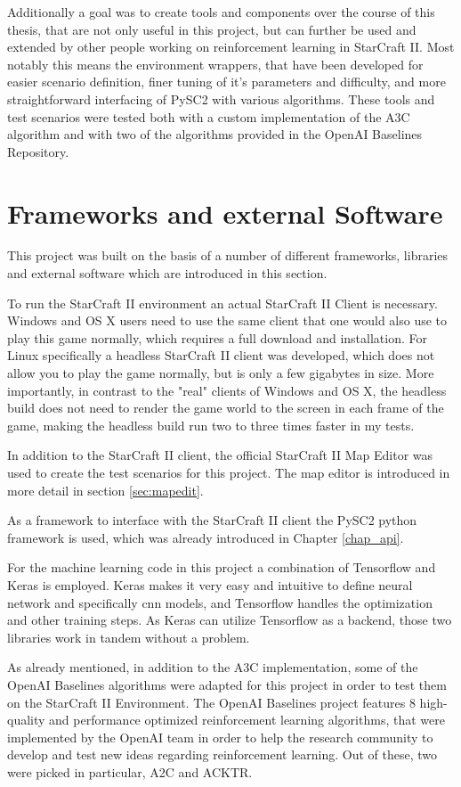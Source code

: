 Additionally a goal was to create tools and components over the course of this thesis, that are not only useful in this project, but can further be used and extended by other people working on reinforcement learning in StarCraft II. Most notably this means the environment wrappers, that have been developed for easier scenario definition, finer tuning of it's parameters and difficulty, and more straightforward interfacing of PySC2 with various algorithms. These tools and test scenarios were tested both with a custom implementation of the A3C algorithm and with two of the algorithms provided in the OpenAI Baselines Repository.

\section{Frameworks and external Software}
\label{sec:fworks}
This project was built on the basis of a number of different frameworks, libraries and external software which are introduced in this section.

To run the StarCraft II environment an actual StarCraft II Client is necessary. Windows and OS X users need to use the same client that one would also use to play this game normally, which requires a full download and installation. For Linux specifically a headless StarCraft II client was developed, which does not allow you to play the game normally, but is only a few gigabytes in size. More importantly, in contrast to the "real" clients of Windows and OS X, the headless build  does not need to render the game world to the screen in each frame of the game, making the headless build run two to three times faster in my tests.

In addition to the StarCraft II client, the official StarCraft II Map Editor was used to create the test scenarios for this project. The map editor is introduced in more detail in section \ref{sec:mapedit}.

As a framework to interface with the StarCraft II client the PySC2 python framework is used, which was already introduced in Chapter \ref{chap_api}.

For the machine learning code in this project a combination of Tensorflow and Keras is employed.
Keras makes it very easy and intuitive to define neural network and specifically cnn models, and Tensorflow handles the optimization and other training steps. As Keras can utilize Tensorflow as a backend, those two libraries work in tandem without a problem.

As already mentioned, in addition to the A3C implementation, some of the OpenAI Baselines algorithms were adapted for this project in order to test them on the StarCraft II Environment. The OpenAI Baselines project features 8 high-quality and performance optimized reinforcement learning algorithms, that were implemented by the OpenAI team in order to help the research community to develop and test new ideas regarding reinforcement learning. Out of these, two were picked in particular, A2C and ACKTR.

